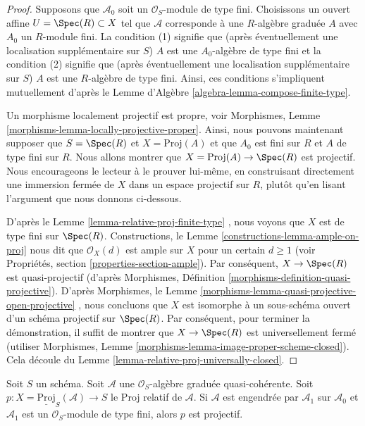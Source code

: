 \begin{proof}
Supposons que  $\mathcal{A}_0$  soit un  $\mathcal{O}_S$-module de type fini. Choisissons un
ouvert affine  $U = \Spec(R) \subset X$  tel que  $\mathcal{A}$  corresponde à une
 $R$-algèbre graduée  $A$  avec  $A_0$  un  $R$-module
fini. La condition (1) signifie que (après éventuellement une localisation
supplémentaire sur  $S$)  $A$  est une  $A_0$-algèbre de type
fini et la condition (2) signifie que (après éventuellement une localisation
supplémentaire sur  $S$)  $A$  est une  $R$-algèbre de type
fini. Ainsi, ces conditions s'impliquent mutuellement d'après le Lemme d'Algèbre
 \ref{algebra-lemma-compose-finite-type}.

\medskip\noindent
Un morphisme localement projectif est propre, voir Morphismes, Lemme  \ref{morphisms-lemma-locally-projective-proper}.
Ainsi, nous pouvons maintenant supposer que  $S = \Spec(R)$  et  $X = \text{Proj}(A)$  et que
 $A_0$  est fini sur  $R$  et  $A$  de type fini sur
 $R$. Nous allons montrer que  $X = \text{Proj}(A) \to \Spec(R)$  est projectif. Nous
encourageons le lecteur à le prouver lui-même, en construisant directement une
immersion fermée de  $X$  dans un espace projectif sur  $R$, plutôt
qu'en lisant l'argument que nous donnons ci-dessous.

\medskip\noindent
D'après le Lemme  \ref{lemma-relative-proj-finite-type} , nous voyons que  $X$  est de type fini sur
 $\Spec(R)$. Constructions, le Lemme  \ref{constructions-lemma-ample-on-proj}  nous dit que  $\mathcal{O}_X(d)$  est
ample sur  $X$  pour un certain  $d \geq 1$  (voir Propriétés, section
 \ref{properties-section-ample}). Par conséquent,  $X \to \Spec(R)$  est quasi-projectif (d'après
Morphismes, Définition  \ref{morphisms-definition-quasi-projective}). D'après Morphismes, le Lemme  \ref{morphisms-lemma-quasi-projective-open-projective} ,
nous concluons que  $X$  est isomorphe à un sous-schéma ouvert d'un schéma
projectif sur  $\Spec(R)$. Par conséquent, pour terminer la démonstration, il
suffit de montrer que  $X \to \Spec(R)$  est universellement fermé (utiliser Morphismes,
Lemme  \ref{morphisms-lemma-image-proper-scheme-closed}). Cela découle du Lemme  \ref{lemma-relative-proj-universally-closed}.
\end{proof}

\begin{lemma}
\label{lemma-relative-proj-projective}
Soit  $S$  un schéma. Soit  $\mathcal{A}$  une  $\mathcal{O}_S$-algèbre graduée
quasi-cohérente. Soit  $p : X = \underline{\text{Proj}}_S(\mathcal{A}) \to S$  le Proj relatif de  $\mathcal{A}$. Si
 $\mathcal{A}$  est engendrée par  $\mathcal{A}_1$  sur  $\mathcal{A}_0$  et  $\mathcal{A}_1$  est un
 $\mathcal{O}_S$-module de type fini, alors  $p$  est projectif.
\end{lemma}

